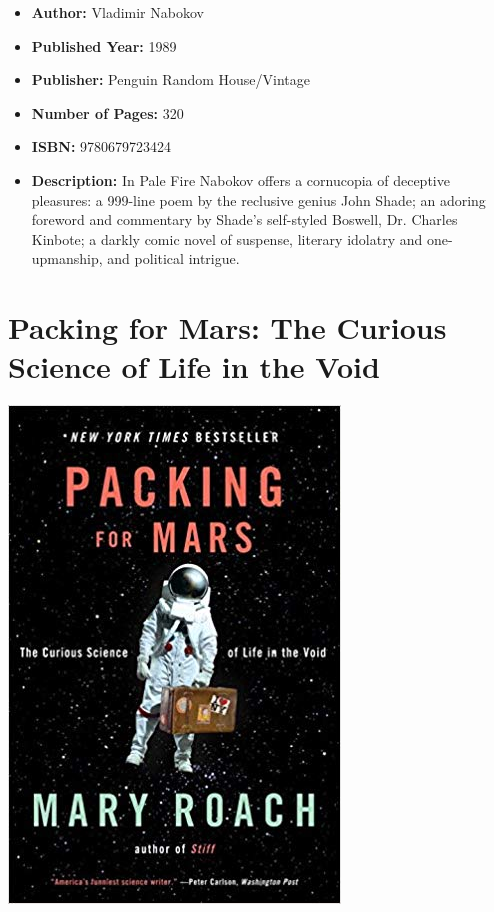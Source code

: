 \documentclass{tufte-handout}
\makeatletter
\newcommand{\varcaption}[2][0pt]{%
  \gsetlength{\@tufte@caption@vertical@offset}{-#1}%
  \gdef\@tufte@stored@varcaption{#2}%
}
\gdef\@tufte@stored@varcaption{} %
\makeatother
\begin{document}
\begin{itemize}
    \item[] \textbf{Author:} Vladimir Nabokov
    \item[] \textbf{Published Year:} 1989
    \item[] \textbf{Publisher:} Penguin Random House/Vintage
    \item[] \textbf{Number of Pages:} 320     
    \item[] \textbf{ISBN:} 9780679723424
    \item[] \textbf{Description:} In Pale Fire Nabokov offers a cornucopia of deceptive pleasures: a 999-line poem by the reclusive genius John Shade; an adoring foreword and commentary by Shade’s self-styled Boswell, Dr. Charles Kinbote; a darkly comic novel of suspense, literary idolatry and one-upmanship, and political intrigue.
\end{itemize}

\section*{Packing for Mars: The Curious Science of Life in the Void}
\begin{marginfigure}[\baselineskip]
   \includegraphics[width=\linewidth]{images/packing_for_mars.jpg}
   \varcaption{\href{https://wwnorton.com/books/9780393339918}{Publisher Link}, \href{https://www.amazon.com/Packing-Mars-Curious-Science-Life/dp/0393339912/}{Amazon Link}}
\end{marginfigure}
\end{document}
